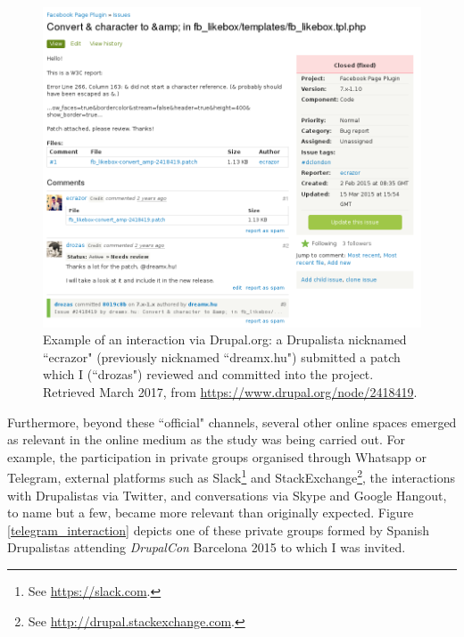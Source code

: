 \begin{figure}[H]
    \centering
    \includegraphics[scale=0.45]{img/tools/d_org_issue.png}
    \caption[Example of an interaction via Drupal.org]%
    {Example of an interaction via Drupal.org: a Drupalista nicknamed ``ecrazor" (previously nicknamed ``dreamx.hu") submitted a patch which I (``drozas") reviewed and committed into the project. Retrieved  March 2017, from \url{https://www.drupal.org/node/2418419}.}
    \label{d_org_interaction}
\end{figure}

Furthermore, beyond these ``official" channels, several other online spaces emerged as relevant in the online medium as the study was being carried out. For example, the participation in private groups organised through Whatsapp or Telegram, external platforms such as Slack\footnote{See \url{https://slack.com}.} and StackExchange\footnote{See \url{http://drupal.stackexchange.com}.}, the interactions with Drupalistas via Twitter, and conversations via Skype and Google Hangout, to name but a few, became more relevant than originally expected. Figure \ref{telegram_interaction} depicts one of these private groups formed by Spanish Drupalistas attending \textit{DrupalCon} Barcelona 2015 to which I was invited.


